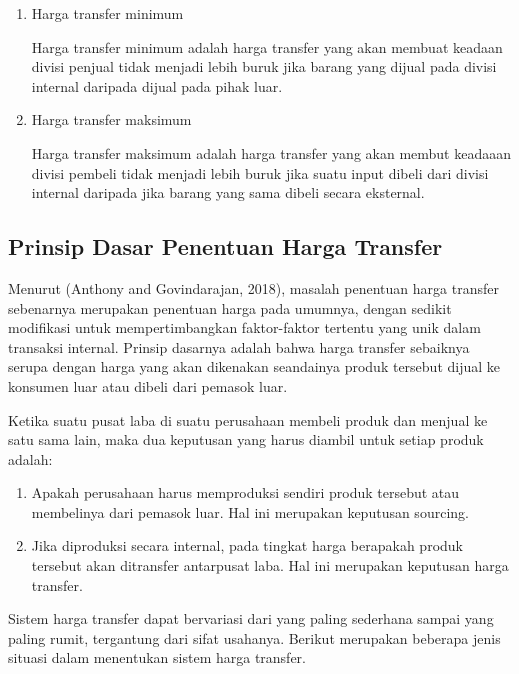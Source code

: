 \begin{enumerate}
	\item Harga transfer minimum
	
	Harga transfer minimum adalah harga transfer yang akan membuat keadaan divisi penjual tidak menjadi lebih buruk jika barang yang dijual pada divisi internal daripada dijual pada pihak luar.

	\item Harga transfer maksimum
	
	Harga transfer maksimum adalah harga transfer yang akan membut keadaaan divisi pembeli tidak menjadi lebih buruk jika suatu input dibeli dari divisi internal daripada jika barang yang sama dibeli secara eksternal. 
\end{enumerate}

\subsection{Prinsip Dasar Penentuan Harga Transfer}

Menurut (Anthony and Govindarajan, 2018), masalah penentuan harga transfer sebenarnya merupakan penentuan harga pada umumnya, dengan sedikit modifikasi untuk mempertimbangkan faktor-faktor tertentu yang unik dalam transaksi internal. Prinsip dasarnya adalah bahwa harga transfer sebaiknya serupa dengan harga yang akan dikenakan seandainya produk tersebut dijual ke konsumen luar atau dibeli dari pemasok luar.

Ketika suatu pusat laba di suatu perusahaan membeli produk dan menjual ke satu sama lain, maka dua keputusan yang harus diambil untuk setiap produk adalah:

\begin{enumerate}
	\item Apakah perusahaan harus memproduksi sendiri produk tersebut atau membelinya dari pemasok luar. Hal ini merupakan keputusan sourcing.

	\item Jika diproduksi secara internal, pada tingkat harga berapakah produk tersebut akan ditransfer antarpusat laba. Hal ini merupakan keputusan harga transfer.
\end{enumerate}

Sistem harga transfer dapat bervariasi dari yang paling sederhana sampai yang paling rumit, tergantung dari sifat usahanya. Berikut merupakan beberapa jenis situasi dalam menentukan sistem harga transfer.

